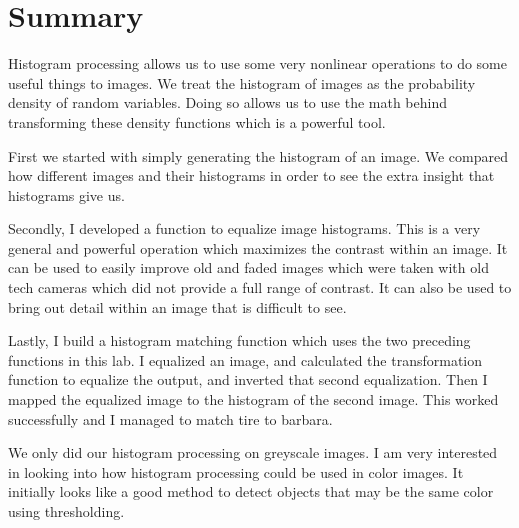 \section{Summary}

Histogram processing allows us to use some very nonlinear operations to do some
useful things to images. We treat the histogram of images as the probability
density of random variables. Doing so allows us to use the math behind
transforming these density functions which is a powerful tool. 

First we started with simply generating the histogram of an image. We compared
how different images and their histograms in order to see the extra insight that
histograms give us.

Secondly, I developed a function to equalize image histograms. This is a very
general and powerful operation which maximizes the contrast within an image. It
can be used to easily improve old and faded images which were taken with old
tech cameras which did not provide a full range of contrast. It can also be used
to bring out detail within an image that is difficult to see.

Lastly, I build a histogram matching function which uses the two preceding
functions in this lab. I equalized an image, and calculated the transformation
function to equalize the output, and inverted that second equalization. Then I
mapped the equalized image to the histogram of the second image. This worked
successfully and I managed to match tire to barbara.

We only did our histogram processing on greyscale images. I am very interested
in looking into how histogram processing could be used in color images. It
initially looks like a good method to detect objects that may be the same color
using thresholding.
